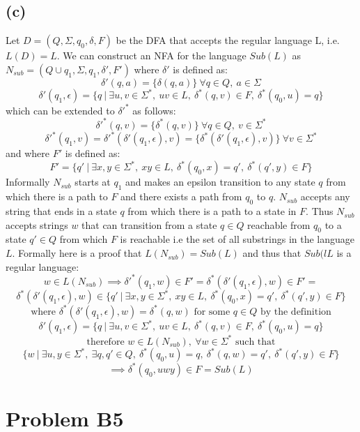 \documentclass[12pt]{article}
\begin{document}
\subsection*{(c)}
  Let $D = (Q, \Sigma, q_0, \delta, F)$ be the DFA that accepts the regular
  language L, i.e. $L(D) = L$. We can construct an NFA for the language
  $Sub(L)$ as $N_{sub} = (Q\cup{q_1}, \Sigma, q_1, \delta{'}, F')$
  where $\delta{'}$ is defined as:
  $$\delta{'}(q, a) = \{\delta(q,a)\} \: \forall q \in Q ,\: a \in \Sigma$$
  $$\delta{'}(q_1, \epsilon) = \{q \:|\: \exists u,v \in \Sigma^* ,\:
  uv \in L ,\: \delta^* (q,v) \in F ,\: \delta^* (q_0,u) = q\}$$
  which can be extended to $\delta{'}^*$ as follows:
  $$\delta{'}^*(q, v) = \{\delta^*(q,v)\} \:
  \forall q \in Q ,\: v \in \Sigma^*$$
  $$\delta{'}^*(q_1, v) = \delta{'}^*(\delta{'}(q_1, \epsilon), v) =
  \{\delta^*(\delta{'}(q_1, \epsilon), v)\}\: \forall v \in \Sigma^*$$
  and where $F'$ is defined as:
  $$F' = \{q' \:|\: \exists x,y \in \Sigma^* ,\: xy \in L
  ,\: \delta^* (q_0, x) = q' ,\: \delta^* (q', y) \in F\}$$
  Informally $N_{sub}$ starts at $q_1$ and makes an epsilon transition to any
  state $q$ from which there is a path to $F$ and there exists a path from
  $q_0$ to $q$. $N_{sub}$ accepts any string that ends in a state $q$ from
  which there is a path to a state in $F$. Thus $N_{sub}$ accepts strings $w$
  that can transition from a state $q \in Q$ reachable from $q_0$ to a state
  $q' \in Q$ from which $F$ is reachable i.e the set of all substrings in the
  language $L$. Formally here is a proof that $L(N_{sub}) = Sub(L)$ and thus
  that $Sub(lL$ is a regular language:
  $$w \in L(N_{sub}) \implies \delta{'}^*(q_1, w) \in F' =
  \delta^*(\delta{'}(q_1, \epsilon), w) \in F' =$$
  $$\delta^*(\delta{'}(q_1, \epsilon), w) \in \{q' \:|\: \exists x,y \in
  \Sigma^* ,\: xy \in L ,\: \delta^* (q_0, x) = q' ,\: \delta^* (q', y)
  \in F\}$$
  $$\text{where }\delta^*(\delta{'}(q_1, \epsilon), w) = \delta^*(q, w)
  \text{ for some } q \in Q \text{ by the definition}$$
  $$\delta{'}(q_1, \epsilon) = \{q \:|\: \exists u,v \in \Sigma^* ,\:
  uv \in L ,\: \delta^* (q,v) \in F ,\: \delta^* (q_0,u) = q\}$$
  $$\text{therefore } w \in L(N_{sub}) ,\: \forall w \in \Sigma^*
  \text{ such that}$$
  $$\{w \:|\: \exists u,y \in \Sigma^* ,\: \exists q,q' \in Q ,\:
  \delta^*(q_0, u) = q ,\: \delta^*(q,w) = q' ,\: \delta^*(q', y) \in F\}$$
  $$\implies \delta^*(q_0, uwy) \in F = Sub(L)$$
\newpage
\section*{Problem B5}
\end{document}
